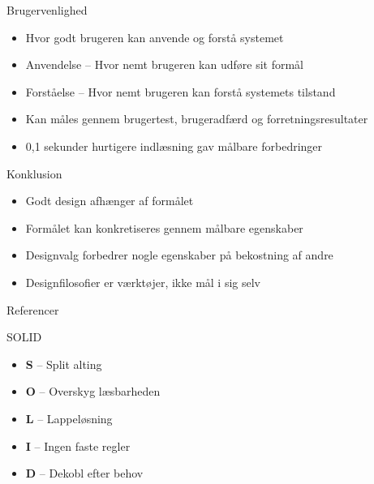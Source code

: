\documentclass{beamer}
\begin{document}
\begin{frame}{Brugervenlighed}
  \begin{itemize}
    \item Hvor godt brugeren kan anvende og forstå systemet
    \item Anvendelse -- Hvor nemt brugeren kan udføre sit formål
    \item Forståelse -- Hvor nemt brugeren kan forstå systemets tilstand
    \item Kan måles gennem brugertest, brugeradfærd og forretningsresultater
    \item 0,1 sekunder hurtigere indlæsning gav målbare forbedringer
    ~\cite{milliseconds_make_millions}

  \end{itemize}
\end{frame}

\begin{frame}{Konklusion}
  \begin{itemize}
    \item Godt design afhænger af formålet
    \item Formålet kan konkretiseres gennem målbare egenskaber
    \item Designvalg forbedrer nogle egenskaber på bekostning af andre
    \item Designfilosofier er værktøjer, ikke mål i sig selv
  \end{itemize}
\end{frame}

\begin{frame}{Referencer}
  \printbibliography[heading=none]
\end{frame}

\begin{frame}{SOLID}
  \begin{itemize}
    \item \textbf{S} -- Split alting
    \item \textbf{O} -- Overskyg læsbarheden
    \item \textbf{L} -- Lappeløsning
    \item \textbf{I} -- Ingen faste regler
    \item \textbf{D} -- Dekobl efter behov
  \end{itemize}
\end{frame}
\end{document}
